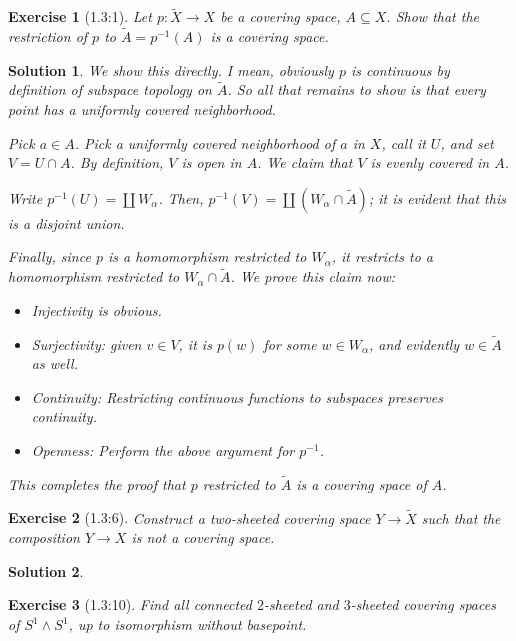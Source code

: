 \documentclass{article}
\theoremstyle{plain}
\newtheorem*{ex}{Exercise}
\theoremstyle{nonumberplain}
\newtheorem{sol}{Solution}
\begin{document}
\begin{ex}[1.3:1]
Let $p \colon \tilde X \to X$ be a covering space, $A \subseteq X$. Show that the restriction of $p$ to $\tilde A = p^{-1}(A)$ is a covering space.
\end{ex}

\begin{sol}
We show this directly. I mean, obviously $p$ is continuous by definition of subspace topology on $\tilde A$. So all that remains to show is that every point has a uniformly covered neighborhood.

Pick $a \in A$. Pick a uniformly covered neighborhood of $a$ in $X$, call it $U$, and set $V = U \cap A$. By definition, $V$ is open in $A$. We claim that $V$ is evenly covered in $A$.

Write $p^{-1}(U) = \coprod W_\alpha$. Then, $p^{-1}(V) = \coprod (W_\alpha \cap \tilde A)$; it is evident that this is a disjoint union.

Finally, since $p$ is a homomorphism restricted to $W_\alpha$, it restricts to a homomorphism restricted to $W_\alpha \cap \tilde A$. We prove this claim now:
\begin{itemize}
\item Injectivity is obvious.
\item Surjectivity: given $v \in V$, it is $p(w)$ for some $w \in W_\alpha$, and evidently $w \in \tilde A$ as well.
\item Continuity: Restricting continuous functions to subspaces preserves continuity.
\item Openness: Perform the above argument for $p^{-1}$.
\end{itemize}

This completes the proof that $p$ restricted to $\tilde A$ is a covering space of $A$.
\end{sol}

\begin{ex}[1.3:6]
Construct a two-sheeted covering space $Y \to \tilde X$ such that the composition $Y \to X$ is not a covering space.
\end{ex}

\begin{sol}

\end{sol}

\begin{ex}[1.3:10]
Find all connected $2$-sheeted and $3$-sheeted covering spaces of $S^1 \wedge S^1$, up to isomorphism without basepoint.
\end{ex}
\end{document}
